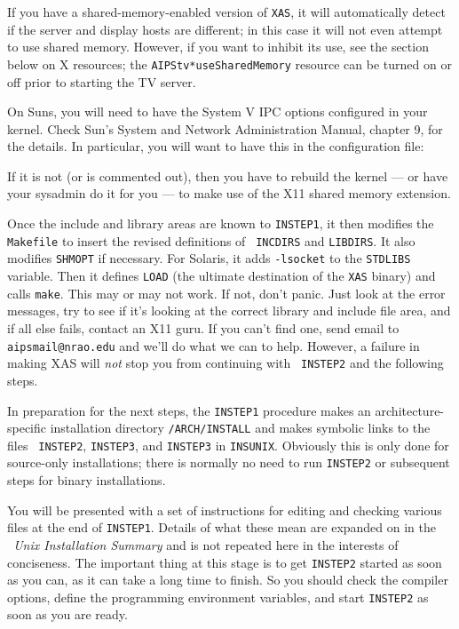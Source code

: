 If you have a shared-memory-enabled version of {\tt XAS}, it will
automatically detect if the server and display hosts are different; in
this case it will not even attempt to use shared memory.  However, if
you want to inhibit its use, see the section below on X resources; the
{\tt AIPStv*useSharedMemory} resource can be turned on or off prior to
starting the TV server.

On Suns, you will need to have the System V IPC options configured in
your kernel.  Check Sun's System and Network Administration Manual,
chapter 9, for the details.  In particular, you will want to have this
in the configuration file:\medskip

\medskip

\noindent If it is not (or is commented out), then you have to rebuild
the kernel --- or have your sysadmin do it for you --- to make use of
the X11 shared memory extension.

Once the include and library areas are known to {\tt INSTEP1}, it then
modifies the {\tt Makefile} to insert the revised definitions of {\tt
INCDIRS} and {\tt LIBDIRS}.  It also modifies {\tt SHMOPT} if necessary.
For Solaris, it adds {\tt -lsocket} to the {\tt STDLIBS} variable.
Then it defines {\tt LOAD} (the ultimate destination of the {\tt XAS}
binary) and calls {\tt make}.  This may or may not work.  If not, don't
panic.  Just look at the error messages, try to see if it's looking at
the correct library and include file area, and if all else fails,
contact an X11 guru.  If you can't find one, send email to {\tt
aipsmail@nrao.edu} and we'll do what we can to help.  However, a failure
in making XAS will {\it not\/} stop you from continuing with {\tt
INSTEP2} and the following steps.
\medskip


In preparation for the next steps, the {\tt INSTEP1} procedure makes an
architecture-specific installation directory
{\tt\thisver/\dol ARCH/INSTALL} and makes symbolic links to the files {\tt
INSTEP2}, {\tt INSTEP3}, and {\tt INSTEP3} in {\tt\dol INSUNIX}.
Obviously this is only done for source-only installations; there is
normally no need to run {\tt INSTEP2} or subsequent steps for binary
installations.

You will be presented with a set of instructions for editing and checking
various files at the end of {\tt INSTEP1}.  Details of what these mean are
expanded on in the {\it \AIPS\ Unix Installation Summary\/} and is not
repeated here in the interests of conciseness.
The important thing at this stage is to get {\tt INSTEP2} started as
soon as you can, as it can take a long time to finish.  So you should
check the compiler options, define the programming environment
variables, and start {\tt INSTEP2} as soon as you are ready.

